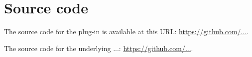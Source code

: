 \chapter{Source code} \label{SourceCode}

The source code for the plug-in is available at this URL: \url{https://github.com/...}.

The source code for the underlying ...: \url{https://github.com/...}.